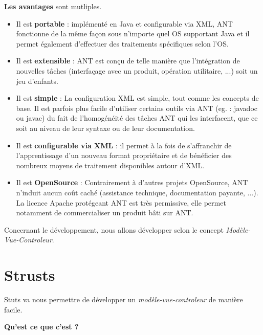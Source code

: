 {\bf Les avantages} sont mutliples.
\begin{itemize}
\item Il est {\bf portable} : impl{\'e}ment{\'e} en Java et configurable via
XML, ANT fonctionne de la m{\^e}me fa{\c c}on sous n'importe quel OS supportant
Java et il permet {\'e}galement d'effectuer des traitements sp{\'e}cifiques selon l'OS.
\item Il est {\bf extensible} : ANT est con{\c c}u de telle mani{\`e}re que l'int{\'e}gration de nouvelles t{\^a}ches (interfa{\c c}age avec un produit, op{\'e}ration utilitaire, ...) soit un jeu d'enfants.
\item Il est {\bf simple} : La configuration XML est simple, tout comme les concepts de base. Il est parfois plus facile d'utiliser certains outils via ANT (eg. : javadoc ou javac) du fait de l'homog{\'e}n{\'e}it{\'e} des t{\^a}ches ANT qui les interfacent, que ce soit au niveau de leur syntaxe ou de leur documentation.
\item Il est {\bf configurable via XML} : il permet {\`a} la fois de s'affranchir de l'apprentissage d'un nouveau format propri{\'e}taire et de b{\'e}n{\'e}ficier des nombreux moyens de traitement disponibles autour d'XML.
\item Il est {\bf OpenSource} : Contrairement {\`a}
d'autres projets OpenSource, ANT n'induit aucun co{\^u}t cach{\'e} (assistance
technique, documentation payante, ...).\\ La licence Apache prot{\'e}geant ANT est tr{\`e}s permissive, elle permet notamment de commercialiser un produit b{\^a}ti sur ANT.\\
\end{itemize}

Concernant le d{\'e}veloppement, nous allons d{\'e}velopper selon le concept
{\it Mod{\`e}le-Vue-Controleur}.\\
\section{Strusts}
Stuts va nous permettre de d{\'e}velopper un {\it mod{\`e}le-vue-controleur} de mani{\`e}re facile.

{\bf Qu'est ce que c'est ?}

